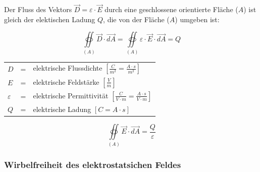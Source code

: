 \begin{minipage}[c]{0.65\columnwidth}

Der Fluss des Vektors $\vec{D} = \varepsilon \cdot \vec{E}$ durch eine geschlossene orientierte Fläche ($A$) ist gleich der elektischen Ladung $Q$, die von der Fläche ($A$) umgeben ist:

    \[
        \boxed{\underset{(A)}{\operatorname*{\oiint}}\vec{D}\cdot\vec{dA} = \underset{(A)}{\operatorname*{\oiint}} \varepsilon \cdot \vec{E}\cdot\vec{dA} = Q}
    \]

    \begin{tabular}{lll}
        $D$ &=& elektrische Flussdichte $\left[\frac{C}{m^2} = \frac{A \cdot s}{m^2}\right]$\\
        $E$ &=& elektrische Feldstärke $\left[\frac{V}{m}\right]$\\
        $\varepsilon$ &=& elektrische Permittivität $\left[\frac{C}{V \cdot m} = \frac{A \cdot s}{V \cdot m}\right]$\\
        $Q$ &=& elektrische Ladung $\left[C = A \cdot s\right]$
    \end{tabular}

    \[
        \boxed{\underset{(A)}{\operatorname*{\oiint}}\vec{E}\cdot\vec{dA}=\frac{Q}{\varepsilon}}
    \]

\end{minipage}

\subsubsection{Wirbelfreiheit des elektrostatsichen Feldes}



